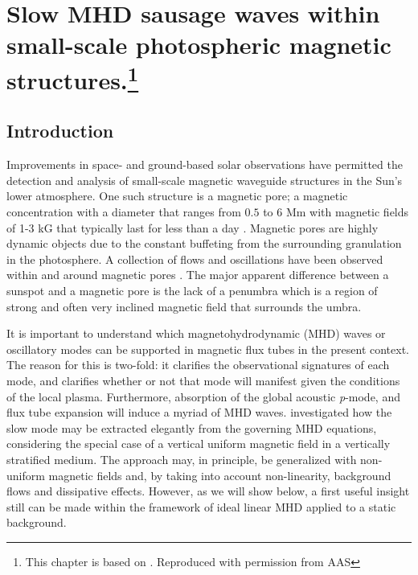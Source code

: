 \graphicspath{{Chapter4/Figs/}}

\chapter[Slow MHD sausage waves]{Slow MHD sausage waves within small-scale photospheric magnetic structures.\footnote{This chapter is based on . Reproduced with permission from AAS}}

   \vspace*{\fill}\par
   \pagebreak

\section{Introduction}
    
    Improvements in space- and ground-based solar observations have permitted the detection and analysis of small-scale magnetic waveguide structures in the Sun's lower atmosphere.
    One such structure is a magnetic pore; a magnetic concentration with a diameter that ranges from $0.5$ to $6$ Mm with magnetic fields of 1-3 kG that typically last for less than a day \citep{1970SoPh...13...85S}.
    Magnetic pores are highly dynamic objects due to the constant buffeting from the surrounding granulation in the photosphere.
    A collection of flows and oscillations have been observed within and around magnetic pores \citep{1999SoPh..187..389B,2002A&A...383..275H,2002A&A...395..249R,doretalb,SAO,Dorotovic2014,freij2014,jess2015multiwavelength,2015A&A...579A..73M}.
    The major apparent difference between a sunspot and a magnetic pore is the lack of a penumbra which is a region of strong and often very inclined magnetic field that surrounds the umbra. 
    
    It is important to understand which magnetohydrodynamic (MHD) waves or oscillatory modes can be supported in magnetic flux tubes in the present context.
    The reason for this is two-fold: it clarifies the observational signatures of each mode, and clarifies whether or not that mode will manifest given the conditions of the local plasma. 
    Furthermore, absorption of the global acoustic \textit{p}-mode, and flux tube expansion will induce a myriad of MHD waves.	
    \citet{roberts} investigated how the slow mode may be extracted elegantly from the governing MHD equations, considering the special case of a vertical uniform magnetic field in a vertically stratified medium.
    The approach may, in principle, be generalized with non-uniform magnetic fields \citep{luna-cardozo} and, by taking into account non-linearity, background flows and dissipative effects.
    However, as we will show below, a first useful insight still can be made within the framework of ideal linear MHD applied to a static background.
    
